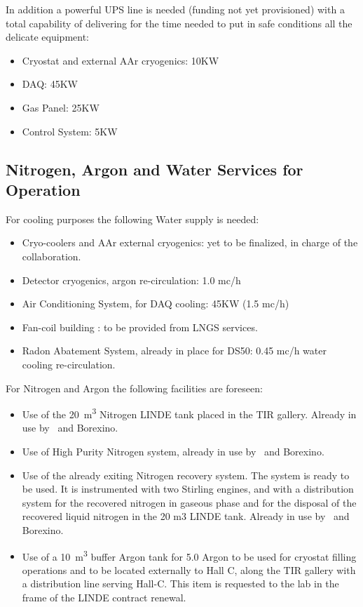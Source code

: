 In addition a powerful UPS line is needed (funding not yet provisioned) with a total capability of delivering \TotalUPSPowerConsumption for the time needed to put in safe conditions all the delicate equipment: 
\begin{itemize}
\item Cryostat and external AAr cryogenics: 10KW
\item DAQ: 45KW 
\item Gas Panel: 25KW 
\item Control System: 5KW 
\end{itemize}

\subsection{Nitrogen, Argon and Water Services for \DSks Operation}
\label{sec:NitrogenArgonAndWater}

For cooling purposes the following Water supply is needed:
\begin{itemize} 
\item Cryo-coolers and AAr external cryogenics: yet to be finalized, in charge of the collaboration. 
\item Detector cryogenics, argon re-circulation: 1.0 mc/h 
\item Air Conditioning System, for DAQ cooling: 45KW (1.5 mc/h)
\item Fan-coil building : to be provided from LNGS services.
\item Radon Abatement System, already in place for DS50: 0.45 mc/h water cooling re-circulation.
\end{itemize} 

\vspace{\baselineskip}

For Nitrogen and Argon the following facilities are foreseen:
\begin{itemize}
\item Use of the \SI{20}{\cubic\meter} Nitrogen LINDE tank placed in the TIR gallery. Already in use by \DSf\ and Borexino. 
\item Use of High Purity Nitrogen system, already in use by \DSf\ and Borexino.
\item Use of the already exiting Nitrogen recovery system. The system is  ready to be used. It is instrumented with two Stirling engines, and with a distribution system for the recovered nitrogen in gaseous phase and for the disposal of the recovered liquid nitrogen in the 20 m3 LINDE tank. Already in use by \DSf\ and Borexino.
\item Use of a \SI{10}{\cubic\meter} buffer Argon tank for 5.0 Argon to be used for cryostat filling operations and to be located externally to Hall C, along the TIR gallery with a distribution line serving Hall-C. This item is requested to the lab in the frame of the LINDE contract renewal.  
\end{itemize}

